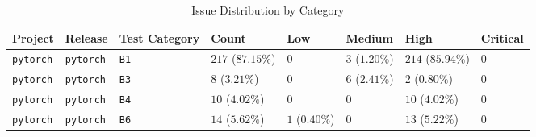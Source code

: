 \begin{table}
\caption{Issue Distribution by Category}
\label{tab:issue-category-distribution}
\begin{tabular}{llllllll}
\toprule
Project & Release & Test Category & Count & Low & Medium & High & Critical \\
\midrule
\texttt{pytorch} & \texttt{pytorch} & \texttt{B1} & $217$ ($87.15\%$) & $0$ & $3$ ($1.20\%$) & $214$ ($85.94\%$) & $0$ \\
\texttt{pytorch} & \texttt{pytorch} & \texttt{B3} & $8$ ($3.21\%$) & $0$ & $6$ ($2.41\%$) & $2$ ($0.80\%$) & $0$ \\
\texttt{pytorch} & \texttt{pytorch} & \texttt{B4} & $10$ ($4.02\%$) & $0$ & $0$ & $10$ ($4.02\%$) & $0$ \\
\texttt{pytorch} & \texttt{pytorch} & \texttt{B6} & $14$ ($5.62\%$) & $1$ ($0.40\%$) & $0$ & $13$ ($5.22\%$) & $0$ \\
\bottomrule
\end{tabular}
\end{table}
